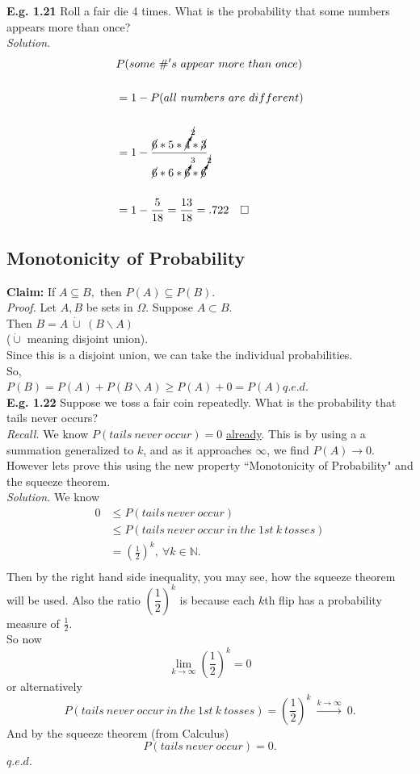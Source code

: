 \documentclass[12pt]{book}
\begin{document}
\noindent \textbf{E.g. 1.21} Roll a fair die 4 times. What is the probability that some numbers appears more than once?\\
\textit{Solution.}
$$
\begin{aligned}
&P(some~\#'s~appear~more~than~once)\\\\
&=1-P(all~numbers~are~different)\\\\
&=1-\frac{\cancel{6}*5*\cancelto{\cancel{2}}{4}*\cancel{3}}{\cancel{6}*6*\cancelto{3}{6}*\cancelto{\cancel{2}}{6}}\\\\
&=1-\frac{5}{18} = \frac{13}{18}=.722~~~\square
\end{aligned}
$$




\subsection{Monotonicity of Probability}
\textbf{Claim:} If $A\subseteq B,$ then $P(A)\subseteq P(B)$.\\
\textit{Proof.} 
Let $A,B$ be sets in $\Omega$.
Suppose $A\subset B$.\\
Then $B=A~\dot{\cup}~(B\backslash A)$\\
($\dot{\cup}$ meaning disjoint union).\\
Since this is a disjoint union, we can take the individual probabilities.\\
So,\\
$P(B)=P(A)+P(B\backslash A) \geq P(A) +0 =P(A)$\hfill $q.e.d.$\\

\noindent \textbf{E.g. 1.22} Suppose we toss a fair coin repeatedly. What is the probability that tails never occurs?\\
\textit{Recall.} We know $P(tails~never~occur)=0$ \hyperlink{infinitely many outcomes}{already}. This is by using a a summation generalized to $k$, and as it approaches $\infty$, we find $P(A)\to 0$.\\
However lets prove this using the new property ``Monotonicity of Probability" and the squeeze theorem.\\

\noindent \textit{Solution.} 
We know
\begin{align*}
0&\leq P(tails~never~occur) \\
&\leq P(tails~never~occur~in~the~1st~k~tosses)\\
&=\left(\frac{1}{2}\right)^{k},~\forall k\in \mathbb{N}.\\
\end{align*}
Then by the right hand side inequality, you may see, how the squeeze theorem will be used. Also the ratio $\left(\dfrac{1}{2}\right)^{k}$ is because each $k$th flip has a probability measure of $\frac{1}{2}$.\\
So now 
$$\lim\limits_{k\to \infty} \left(\frac{1}{2}\right)^{k}=0$$
or alternatively 
$$P(tails~never~occur~in~the~1st~k~tosses)=\left(\frac{1}{2}\right)^{k} ~\xrightarrow{k\to \infty}~0.$$
And by the squeeze theorem (from Calculus)
$$P(tails~never~occur)=0.$$\hfill$q.e.d.$
\end{document}
